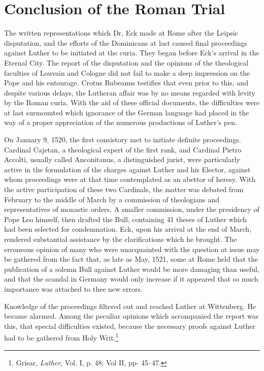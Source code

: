 \section{Conclusion of the Roman Trial}

The written representations which Dr, Eck made at Rome after the
Leipsic disputation, and the efforts of the Dominicans at last caused
final proceedings against Luther to be initiated at the curia. They
began before Eck’s arrival in the Eternal City. The report of the disputation
and the opinions of the theological faculties of Louvain and
Cologne did not fail to make a deep impression on the Pope and his
entourage. Crotus Rubeanus testifies that even prior to this, and despite
various delays, the Lutheran affair was by no means regarded
with levity by the Roman curia. With the aid of these official documents,
the difficulties were at last surmounted which ignorance of
the German language had placed in the way of a proper appreciation
of the numerous productions of Luther’s pen.

On January 9, 1520, the first consistory met to initiate definite
proceedings. Cardinal Cajetan, a theological expert of the first rank,
and Cardinal Pietro Accolti, usually called Anconitanus, a distinguished
jurist, were particularly active in the formulation of the
charges against Luther and his Elector, against whom proceedings
were at that time contemplated as an abettor of heresy. With the
active participation of these two Cardinals, the matter was debated
from February to the middle of March by a commission of theologians
and representatives of monastic orders. A smaller commission, under
the presidency of Pope Leo himself, then drafted the Bull, containing
41 theses of Luther which had been selected for condemnation. Eck,
upon his arrival at the end of March, rendered substantial assistance
by the clarifications which he brought. The erroneous opinion of
many who were unacquainted with the question at issue may be
gathered from the fact that, as late as May, 1521, some at Rome held
that the publication of a solemn Bull against Luther would be more
damaging than useful, and that the scandal in Germany would only
increase if it appeared that so much importance was attached to thee
new errors.

Knowledge of the proceedings filtered out and reached Luther at
Wittenberg. He became alarmed. Among the peculiar opinions which
accompanied the report was this, that special difficulties existed, because
the necessary proofs against Luther had to be gathered from
Holy Writ.\footnote{Grisar, \textit{Luther}, Vol. I, p. 48; Vol II, pp- 45--47.}


